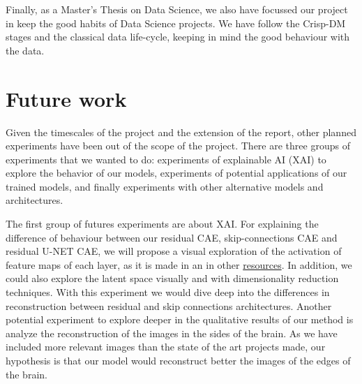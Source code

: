 Finally, as a Master's Thesis on Data Science, we also have focussed our project in keep the good habits of Data Science projects. We have follow the Crisp-DM stages and the classical data life-cycle, keeping in mind the good behaviour with the data.


\section{Future work}

Given the timescales of the project and the extension of the report, other planned experiments have been out of the scope of the project. There are three groups of experiments that we wanted to do: experiments of explainable AI (XAI) to explore the behavior of our models, experiments of potential applications of our trained models, and finally experiments with other alternative models and architectures.

The first group of futures experiments are about XAI. For explaining the difference of behaviour between our residual CAE, skip-connections CAE and residual U-NET CAE, we will propose a visual exploration of the activation of feature maps of each layer, as it is made in \cite{kernelsactivation} an in other \href{https://towardsdatascience.com/using-skip-connections-to-enhance-denoising-autoencoder-algorithms-849e049c0ac9}{resources}. In addition, we could also explore the latent space visually and with dimensionality reduction techniques. With this experiment we would dive deep into the differences in reconstruction between residual and skip connections architectures. Another potential experiment to explore deeper in the qualitative results of our method is analyze the reconstruction of the images in the sides of the brain. As we have included more relevant images than the state of the art projects made, our hypothesis is that our model would reconstruct better the images of the edges of the brain.

